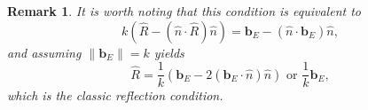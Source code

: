 \documentclass{article}
\newcommand{\norm}[1]{\left\lVert #1 \right\rVert}
\theoremstyle{plain}
\newtheorem*{remark}{Remark}
\begin{document}
\begin{remark}
It is worth noting that this condition is equivalent to
\begin{equation}
	k(\hat{R} - (\hat{n}\cdot\hat{R})\hat{n}) = \mathbf{b}_E - (\hat{n}\cdot\mathbf{b}_E)\hat{n},
\end{equation}
and assuming $\norm{\mathbf{b}_E}=k$ yields
\begin{equation}
	\hat{R} = \frac{1}{k}\left( \mathbf{b}_E - 2(\mathbf{b}_E\cdot\hat{n})\hat{n} \right) \text{ or } \frac{1}{k}\mathbf{b}_E,
\end{equation}
which is the classic reflection condition.
\end{remark}

















\end{document}
